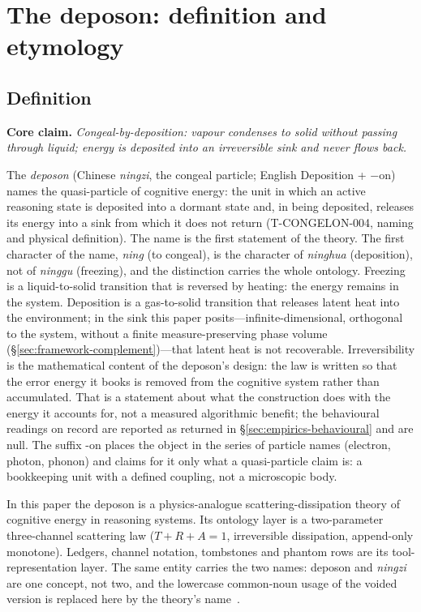 \documentclass[11pt,a4paper]{article}
\begin{document}
\section{The deposon: definition and etymology}
\label{sec:def}

\subsection{Definition}
\label{sec:def-definition}

\textbf{Core claim.} \emph{Congeal-by-deposition: vapour condenses to solid without passing through liquid; energy is deposited into an irreversible sink and never flows back.}

The \emph{deposon} (Chinese \emph{ningzi}, the congeal particle; English Deposition + $-$on) names the quasi-particle of cognitive energy: the unit in which an active reasoning state is deposited into a dormant state and, in being deposited, releases its energy into a sink from which it does not return (T-CONGELON-004, naming and physical definition). The name is the first statement of the theory. The first character of the name, \emph{ning} (to congeal), is the character of \emph{ninghua} (deposition), not of \emph{ninggu} (freezing), and the distinction carries the whole ontology. Freezing is a liquid-to-solid transition that is reversed by heating: the energy remains in the system. Deposition is a gas-to-solid transition that releases latent heat into the environment; in the sink this paper posits---infinite-dimensional, orthogonal to the system, without a finite measure-preserving phase volume (\S\ref{sec:framework-complement})---that latent heat is not recoverable. Irreversibility is the mathematical content of the deposon's design: the law is written so that the error energy it books is removed from the cognitive system rather than accumulated. That is a statement about what the construction does with the energy it accounts for, not a measured algorithmic benefit; the behavioural readings on record are reported as returned in \S\ref{sec:empirics-behavioural} and are null. The suffix -on places the object in the series of particle names (electron, photon, phonon) and claims for it only what a quasi-particle claim is: a bookkeeping unit with a defined coupling, not a microscopic body.

In this paper the deposon is a physics-analogue scattering-dissipation theory of cognitive energy in reasoning systems. Its ontology layer is a two-parameter three-channel scattering law ($T+R+A=1$, irreversible dissipation, append-only monotone). Ledgers, channel notation, tombstones and phantom rows are its tool-representation layer. The same entity carries the two names: deposon and \emph{ningzi} are one concept, not two, and the lowercase common-noun usage of the voided version is replaced here by the theory's name~\cite{deposon2026}.
\end{document}
